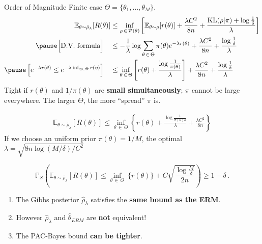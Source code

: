 \documentclass[aspectratio=159]{beamer}
\begin{document}
    \begin{frame}{Order of Magnitude}
     Finite case \(\Theta = \{\theta_1, \dots, \theta_M\}\).
        \[
        \begin{aligned}
            \mathbb{E}_{\theta \sim \hat{\rho}_\lambda}[R(\theta)] &\leq \inf_{\rho \, \in \, \mathcal{P}(\theta)} \left[\mathbb{E}_{\theta \sim \rho}[r(\theta)] + \frac{\lambda C^2}{8n} + \frac{\text{KL}(\rho|\pi) + \log\tfrac{1}{\delta}}{\lambda}\right]\\\pause
            \Big[\text{D.V. formula}\Big] \quad &\leq -\frac{1}{\lambda}\log \sum_{\theta \, \in \, \Theta} \pi(\theta)e^{-\lambda r(\theta)} + \frac{\lambda C^2}{8n}+ \frac{\log \tfrac{1}{\delta}}{\lambda}\\\pause
            \left[e^{-\lambda r(\theta)} \leq e^{-\lambda \inf_{\eta \in \Theta}r(\eta)}\right] \quad &\leq \inf_{\theta \, \in\,  \Theta} \left[ r(\theta) + \frac{\log \frac{1}{\pi(\theta)}}{\lambda} \right] + \frac{\lambda C^2}{8n}+ \frac{\log \tfrac{1}{\delta}}{\lambda}
        \end{aligned}
        \]
        \pause
        Tight if \(r(\theta)\) and \(1/\pi(\theta)\) are \textbf{small simultaneously}; \(\pi\) cannot be large everywhere. The larger \(\Theta\), the more ``spread'' \(\pi\) is.
    \end{frame}

    \begin{frame}
        \[
        \begin{aligned}
            \mathbb{E}_{\theta \sim \hat{\rho}_\lambda}[R(\theta)] \leq \inf_{\theta \, \in \,\Theta} \left\{r(\theta) + \frac{\log \frac{1}{\pi(\theta)\delta }}{\lambda} + \frac{\lambda C^2}{8n} \right\}
        \end{aligned}
        \]
        If we choose an uniform prior \(\pi(\theta) = 1/M\), the optimal \(\lambda = \sqrt{8n \log(M/\delta)/C^2}\)

        \[
        \mathbb{P}_S\left( \mathbb{E}_{\theta \sim \hat{\rho}_\lambda}[R(\theta)] \leq \inf_{\theta \, \in \, \Theta} \ \{r(\theta)\} + C \sqrt{\frac{\log \tfrac{M}{\delta}}{2n}}\right) \geq 1-\delta\,.
        \]
        \pause
        \begin{enumerate}
            \item The Gibbs posterior \(\hat{\rho}_\lambda\) satisfies the \textbf{same bound as the ERM}.
            \item However \(\hat{\rho}_\lambda\) and \(\hat{\theta}_{ERM}\) are \textbf{not} equivalent! 
            \item The PAC-Bayes bound \textbf{can be tighter}. 
        \end{enumerate}
    \end{frame}
\end{document}
